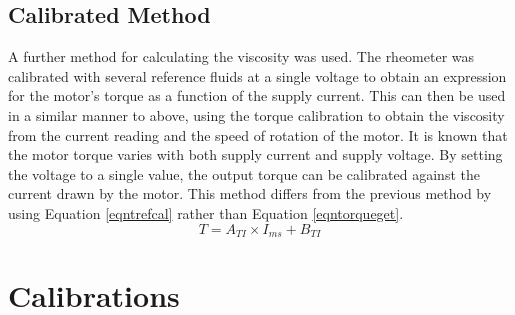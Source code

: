 \documentclass[twoside,a4]{report}
\def\br{\newline \newline \noindent}
\begin{document}
	\subsection*{Calibrated Method}
	A further method for calculating the viscosity was used. The rheometer was calibrated with several reference fluids at a single voltage to obtain an expression for the motor's torque as a function of the supply current. This can then be used in a similar manner to above, using the torque calibration to obtain the viscosity from the current reading and the speed of rotation of the motor.
	\br
	It is known that the motor torque varies with both supply current and supply voltage. By setting the voltage to a single value, the output torque can be calibrated against the current drawn by the motor. This method differs from the previous method by using Equation \ref{eqntrefcal} rather than Equation \ref{eqntorqueget}.
	\begin{equation}
	T = A_{TI} \times I_{ms} + B_{TI}
	\label{eqntrefcal}
	\end{equation}
	\section{Calibrations}
	
\end{document}
